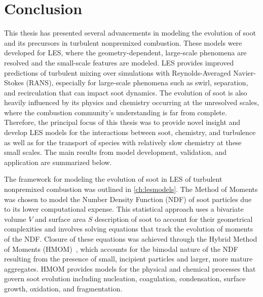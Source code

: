 \chapter{Conclusion\label{ch:conclusion}}

This thesis has presented several advancements in modeling the evolution of soot and its precursors in turbulent nonpremixed combustion. These models were developed for LES, where the geometry-dependent, large-scale phenomena are resolved and the small-scale features are modeled. LES provides improved predictions of turbulent mixing over simulations with Reynolds-Averaged Navier-Stokes (RANS), especially for large-scale phenomena such as swirl, separation, and recirculation that can impact soot dynamics. The evolution of soot is also heavily influenced by its physics and chemistry occurring at the unresolved scales, where the combustion community's understanding is far from complete. Therefore, the principal focus of this thesis was to provide novel insight and develop LES models for the interactions between soot, chemistry, and turbulence as well as for the transport of species with relatively slow chemistry at these small scales. The main results from model development, validation, and application are summarized below.

The framework for modeling the evolution of soot in LES of turbulent nonpremixed combustion was outlined in \cref{ch:lesmodels}. The Method of Moments was chosen to model the Number Density Function (NDF) of soot particles due to its lower computational expense. This statistical approach uses a bivariate volume $V$ and surface area $S$ description of soot to account for their geometrical complexities and involves solving equations that track the evolution of moments of the NDF. Closure of these equations was achieved through the Hybrid Method of Moments (HMOM)~\cite{hmom2009}, which accounts for the bimodal nature of the NDF resulting from the presence of small, incipient particles and larger, more mature aggregates. HMOM provides models for the physical and chemical processes that govern soot evolution including nucleation, coagulation, condensation, surface growth, oxidation, and fragmentation.

